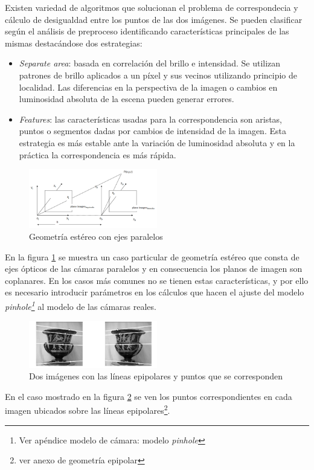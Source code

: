Existen variedad de algoritmos que solucionan el problema de correspondecia y cálculo de desigualdad entre los puntos de las dos imágenes. Se pueden clasificar según el análisis de preproceso identificando características principales de las mismas destacándose dos estrategias\cite{StructureFromStereo}:
\begin{itemize}
   \item \emph{Separate area}: basada en correlación del brillo e intensidad. Se utilizan patrones de brillo aplicados a un píxel y sus vecinos utilizando principio de localidad. Las diferencias en la perspectiva de la imagen o cambios en luminosidad absoluta de la escena pueden generar errores.
   \item \emph{Features}: las características usadas para la correspondencia son aristas, puntos o segmentos dadas por cambios de intensidad de la imagen. Esta estrategia es más estable ante la variación de luminosidad absoluta y en la práctica la correspondencia es más rápida.
\end{itemize}

\begin{figure}[H]
  \centering
    \includegraphics[width=0.5\textwidth]{./Cap2_videomapping/stereo.PNG}
  \caption[Structure from Stereo- A Review Umesh R. Dhond and J.K.Aggarwal 1989]{Geometría estéreo con ejes paralelos}
  \label{fig:Stereo}
\end{figure}
En la figura \ref{fig:Stereo} se muestra un caso particular de geometría estéreo que consta de ejes ópticos de las cámaras paralelos y en consecuencia los planos de imagen son coplanares. En los casos más comunes no se tienen estas características, y por ello es necesario introducir parámetros en los cálculos que hacen el ajuste del modelo \emph{pinhole\footnote{Ver apéndice modelo de cámara: modelo \emph{pinhole}}} al modelo de las cámaras reales.

\begin{figure}[H]
  \centering
    \includegraphics[width=0.5\textwidth]{./Cap2_videomapping/epipolar3.PNG}
  \caption[Geometría de Cámaras StereoReview pag 241. fig 9.3]{Dos imágenes con las líneas epipolares y puntos que se corresponden}
  \label{fig:Stereo2}
\end{figure}
En el caso mostrado en la figura \ref{fig:Stereo2} se ven los puntos correspondientes en cada imagen ubicados sobre las líneas epipolares\footnote{ver anexo de geometría epipolar}.

